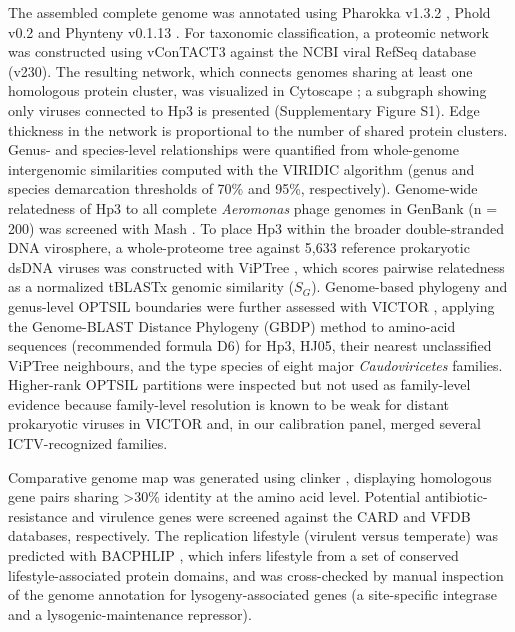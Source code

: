 \documentclass[11pt,a4paper]{article}
\begin{document}
The assembled complete genome was annotated using Pharokka v1.3.2
\citep{2022-Pharokka_Bouras}, Phold v0.2 \citep{2026-Protein_Bouras} and
Phynteny v0.1.13 \citep{2024-Susiegriggo_SusieGrigson}. For taxonomic
classification, a proteomic network was constructed using vConTACT3 \citep{2025-Machine_Bolduc} against the NCBI viral RefSeq database (v230). The resulting network, which connects
genomes sharing at least one homologous protein cluster, was visualized
in Cytoscape \citep{2003-Cytoscape_Shannon}; a subgraph showing only
viruses connected to Hp3 is presented (Supplementary Figure S1).
Edge thickness in the network is proportional to the number of shared
protein clusters. Genus- and species-level relationships were quantified
from whole-genome intergenomic similarities computed with the VIRIDIC
algorithm \citep{2020-VIRIDIC_Moraru} (genus and species demarcation
thresholds of 70\% and 95\%, respectively). Genome-wide relatedness of
Hp3 to all complete \emph{Aeromonas} phage genomes in GenBank (n = 200)
was screened with Mash \citep{2016-Mash_Ondov}. To place Hp3 within the
broader double-stranded DNA virosphere, a whole-proteome tree against
5,633 reference prokaryotic dsDNA viruses was constructed with ViPTree
\citep{2017-ViPTree_Nishimura}, which scores pairwise relatedness as a
normalized tBLASTx genomic similarity (\(S_G\)). Genome-based phylogeny
and genus-level OPTSIL boundaries were further assessed with VICTOR
\citep{2017-VICTOR_Meier-Kolthoff}, applying the Genome-BLAST Distance
Phylogeny (GBDP) method to amino-acid sequences (recommended formula D6)
for Hp3, HJ05, their nearest unclassified ViPTree neighbours, and the
type species of eight major \emph{Caudoviricetes} families. Higher-rank
OPTSIL partitions were inspected but not used as family-level evidence
because family-level resolution is known to be weak for distant
prokaryotic viruses in VICTOR and, in our calibration panel, merged
several ICTV-recognized families.

Comparative
genome map was generated using clinker \citep{2021-Clinker_Gilchrist},
displaying homologous gene pairs sharing \textgreater30\% identity at
the amino acid level. Potential antibiotic-resistance and virulence
genes were screened against the CARD \citep{2020-CARD_Alcock} and VFDB
\citep{2019-VFDB_Liu} databases, respectively. The replication lifestyle
(virulent versus temperate) was predicted with BACPHLIP
\citep{2021-BACPHLIP_Hockenberry}, which infers lifestyle from a set of
conserved lifestyle-associated protein domains, and was cross-checked by
manual inspection of the genome annotation for lysogeny-associated genes
(a site-specific integrase and a lysogenic-maintenance repressor).
\end{document}
